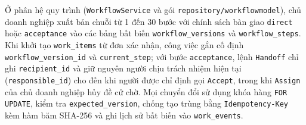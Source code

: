 Ở phân hệ quy trình (\texttt{WorkflowService} và gói \texttt{repository/\hspace{0pt}workflowmodel}), chủ doanh nghiệp xuất bản chuỗi từ 1 đến 30 bước với chính sách bàn giao
\texttt{direct} hoặc \texttt{acceptance} vào các bảng bất biến \texttt{workflow\_\hspace{0pt}versions} và \texttt{workflow\_\hspace{0pt}steps}.
Khi khởi tạo \texttt{work\_\hspace{0pt}items} từ đơn xác nhận, công việc gắn cố định \texttt{workflow\_\hspace{0pt}version\_\hspace{0pt}id} và \texttt{current\_\hspace{0pt}step}; với bước \texttt{acceptance}, lệnh
\texttt{Handoff} chỉ ghi \texttt{recipient\_\hspace{0pt}id} và giữ nguyên người chịu trách nhiệm hiện tại (\texttt{responsible\_\hspace{0pt}id}) cho đến khi người được chỉ định gọi \texttt{Accept}, trong khi
\texttt{Assign} của chủ doanh nghiệp hủy đề cử chờ.
Mọi chuyển đổi sử dụng khóa hàng \texttt{FOR UPDATE}, kiểm tra \texttt{expected\_\hspace{0pt}version}, chống tạo trùng bằng \texttt{Idempotency-\hspace{0pt}Key} kèm hàm băm SHA-256 và ghi lịch sử bất
biến vào \texttt{work\_\hspace{0pt}events}.

